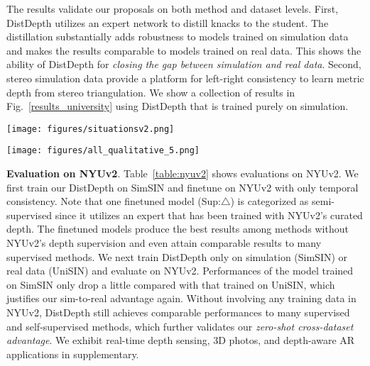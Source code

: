 \documentclass[10pt,twocolumn,letterpaper]{article}
\begin{document}
The results validate our proposals on both method and dataset levels. First, DistDepth utilizes an expert network to distill knacks to the student. The distillation substantially adds robustness to models trained on simulation data and makes the results comparable to models trained on real data. This shows the ability of DistDepth for \textit{closing the gap between simulation and real data}. Second, stereo simulation data provide a platform for left-right consistency to learn metric depth from stereo triangulation. We show a collection of results in Fig.~\ref{results_university} using DistDepth that is trained purely on simulation.

\begin{figure*}[bt!]
    \centering
    \texttt{[image: figures/situationsv2.png]}
    \vspace{-4pt}
    \caption{\textbf{Comparison on UniSIN.} Geometric shapes produced from DistDepth are better than MonoDepth2. DistDepth concretely reduces the gap for sim-to-real: (3) and (4) attain on-par results and sometimes training on simulation shows better structure than training on real.}
    \vspace{-5pt}
    \label{results_comparison}
\end{figure*}

\begin{figure*}[bt!]
    \centering
    \texttt{[image: figures/all\_qualitative\_5.png]}
    \vspace{-15pt}
    \caption{\textbf{Results on real data (UniSIN) using our DistDepth only trained on simulation (SimSIN).}}
    \vspace{-5pt}
    \label{results_university}
\end{figure*}

\textbf{Evaluation on NYUv2}. Table~\ref{table:nyuv2} shows evaluations on NYUv2.
We first train our DistDepth on SimSIN and finetune on NYUv2 with only temporal consistency.
Note that one finetuned model (Sup:$\triangle$) is categorized as semi-supervised since it utilizes an expert that has been trained with NYUv2's curated depth. The finetuned models produce the best results among  methods without NYUv2's depth supervision and even attain comparable results to many supervised methods.
We next train DistDepth only on simulation (SimSIN) or real data (UniSIN) and evaluate on NYUv2.
Performances of the model trained on SimSIN only drop a little compared with that trained on UniSIN, which justifies our sim-to-real advantage again.
Without involving any training data in NYUv2, DistDepth still achieves comparable performances to many supervised and self-supervised methods, which further validates our \textit{zero-shot cross-dataset advantage}. 
We exhibit real-time depth sensing, 3D photos, and depth-aware AR applications in supplementary. 
\end{document}
